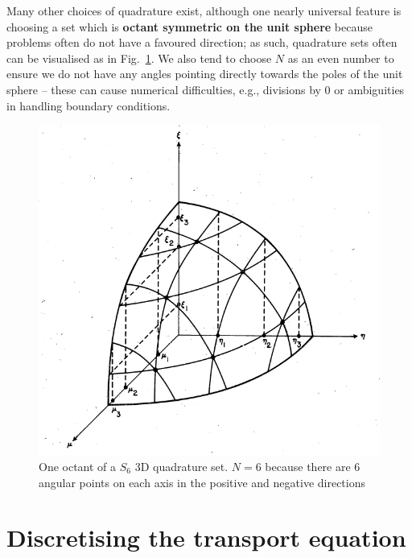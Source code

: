 \documentclass{article}
\begin{document}
Many other choices of quadrature exist, although one nearly universal feature is choosing a set which is \textbf{octant symmetric on the unit sphere} because problems often do not have a favoured direction; as such, quadrature sets often can be visualised as in Fig.~\ref{fig:3D_quad}. We also tend to choose $N$ as an even number to ensure we do not have any angles pointing directly towards the poles of the unit sphere -- these can cause numerical difficulties, e.g., divisions by 0 or ambiguities in handling boundary conditions.

\begin{figure}[h!]
	\centering
	\includegraphics[scale=0.5]{./images/quadrature_octant.png} 
	\caption{One octant of a $S_6$ 3D quadrature set. $N=6$ because there are 6 angular points on each axis in the positive and negative directions~\cite{Lathrop}} 
	\label{fig:3D_quad}
\end{figure}

\section{Discretising the transport equation}
\end{document}
